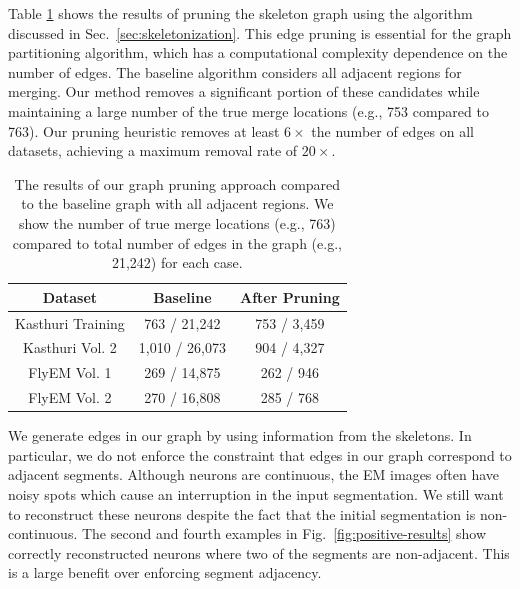 Table \ref{table:skeletonization} shows the results of pruning the skeleton graph using the algorithm discussed in Sec.~\ref{sec:skeletonization}. This edge pruning is essential for the graph partitioning algorithm, which has a computational complexity dependence on the number of edges. The baseline algorithm considers all adjacent regions for merging. Our method removes a significant portion of these candidates while maintaining a large number of the true merge locations (e.g., 753 compared to 763). Our pruning heuristic removes at least $6\times$ the number of edges on all datasets, achieving a maximum removal rate of $20\times$.

\begin{table}
	\centering
	\small
	\begin{tabular}{c c c} \hline
		\textbf{Dataset} & \textbf{Baseline} & \textbf{After Pruning} \\ \hline
		Kasthuri Training & 763 / 21,242 & 753 / 3,459 \\
		Kasthuri Vol. 2 & 1,010 / 26,073 & 904 / 4,327 \\
		FlyEM Vol. 1 & 269 / 14,875 & 262 / 946 \\
		FlyEM Vol. 2 & 270 / 16,808 & 285 / 768 \\ \hline
	\end{tabular}
	\caption{The results of our graph pruning approach compared to the baseline graph with all adjacent regions. We show the number of true merge locations (e.g., 763) compared to total number of edges in the graph (e.g., 21,242) for each case.}
	\label{table:skeletonization}
\end{table}

We generate edges in our graph by using information from the skeletons. 
In particular, we do not enforce the constraint that edges in our graph correspond to adjacent segments.
Although neurons are continuous, the EM images often have noisy spots which cause an interruption in the input segmentation.
We still want to reconstruct these neurons despite the fact that the initial segmentation is non-continuous. 
The second and fourth examples in Fig.~\ref{fig:positive-results} show correctly reconstructed neurons where two of the segments are non-adjacent. 
This is a large benefit over enforcing segment adjacency. 

